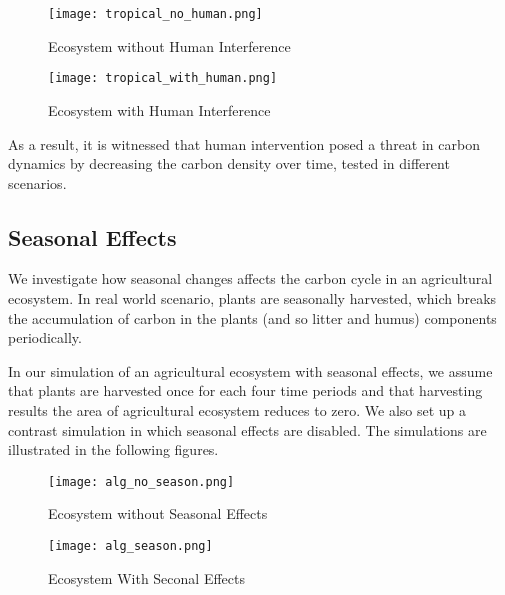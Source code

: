 \documentclass[a4paper]{article}
\begin{document}
\begin{figure}[!htb]
   \begin{minipage}{0.48\textwidth}
     \centering
     \texttt{[image: tropical\_no\_human.png]}
     \caption{Ecosystem without Human Interference}
   \end{minipage}\hfill
   \begin{minipage}{0.48\textwidth}
     \centering
     \texttt{[image: tropical\_with\_human.png]}
     \caption{Ecosystem with Human Interference}
   \end{minipage}
\end{figure}

As a result, it is witnessed that human intervention posed a threat in carbon dynamics by decreasing the carbon density over time, tested in different scenarios. 


\subsection{Seasonal Effects}

We investigate how seasonal changes affects the carbon cycle in an agricultural ecosystem. In real world scenario, plants are seasonally harvested, which breaks the accumulation of carbon in the plants (and so litter and humus) components periodically. 

In our simulation of an agricultural ecosystem with seasonal effects, we assume that plants are harvested once for each four time periods and that harvesting results the area of agricultural ecosystem reduces to zero. We also set up a contrast simulation in which seasonal effects are disabled. The simulations are illustrated in the following figures. 

\begin{figure}[!htb]
   \begin{minipage}{0.48\textwidth}
     \centering
     \texttt{[image: alg\_no\_season.png]}
     \caption{Ecosystem without Seasonal Effects}
   \end{minipage}\hfill
   \begin{minipage}{0.48\textwidth}
     \centering
     \texttt{[image: alg\_season.png]}
     \caption{Ecosystem With Seconal Effects}
   \end{minipage}
\end{figure}
\end{document}
